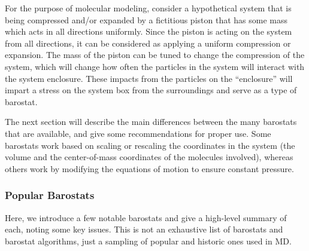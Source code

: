 \documentclass[9pt,bestpractices]{livecoms}
\begin{document}
For the purpose of molecular modeling, consider a hypothetical system that is being compressed and/or expanded by a fictitious piston that has some mass which acts in all directions uniformly.
Since the piston is acting on the system from all directions, it can be considered as applying a uniform compression or expansion.
The mass of the piston can be tuned to change the compression of the system, which will change how often the particles in the system will interact with the system enclosure.
These impacts from the particles on the ``enclosure'' will impart a stress on the system box from the surroundings and serve as a type of barostat.

The next section will describe the main differences between the many barostats that are available, and give some recommendations for proper use.
Some barostats work based on scaling or rescaling the coordinates in the system (the volume and the center-of-mass coordinates of the molecules involved), whereas others work by modifying the equations of motion to ensure constant pressure.

\subsubsection{Popular Barostats}
Here, we introduce a few notable barostats and give a high-level summary of each, noting some key issues.
This is not an exhaustive list of barostats and barostat algorithms, just a sampling of popular and historic ones used in MD\@.
\end{document}
